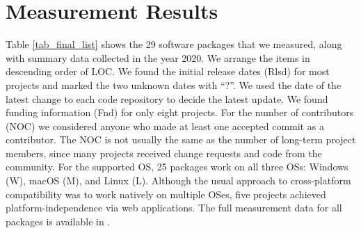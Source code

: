 \documentclass[final, 3p, times, authoryear]{elsarticle}
\begin{document}
\section{Measurement Results} \label{ch_results}

Table \ref{tab_final_list} shows the 29 software packages that we measured,
along with summary data collected in the year 2020. We arrange the items in
descending order of LOC. We found the initial release dates (Rlsd) for most
projects and marked the two unknown dates with ``?''. We used the date of the
latest change to each code repository to decide the latest update. We found
funding information (Fnd) for only eight projects.  For the number of
contributors (NOC) we considered anyone who made at least one accepted commit as
a contributor. The NOC is not usually the same as the number of long-term
project members, since many projects received change requests and code from the
community.  For the supported OS, 25 packages work on all three OSs: Windows
(W), macOS (M), and Linux (L). Although the usual approach to cross-platform
compatibility was to work natively on multiple OSes, five projects achieved
platform-independence via web applications. The full measurement data for all
packages is available in \citet{Dong2021-Data}.
\end{document}
